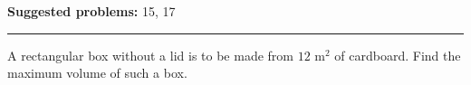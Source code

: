 \documentclass[12pt,reqno]{amsart}
\begin{document}
\textbf{Suggested problems:} 15, 17

\bigskip
\hrule

\bigskip

\prob A rectangular box without a lid is to be made from $12$ m$^2$ of cardboard. Find the maximum volume of such a box.
\end{document}
